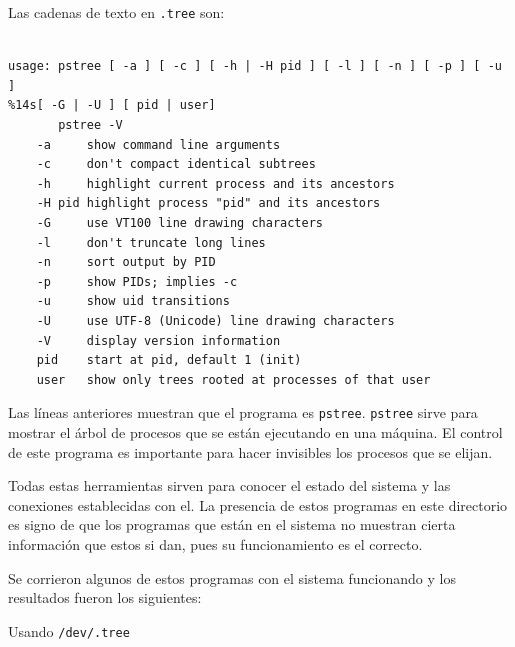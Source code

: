 \vspace{1em}

 Las cadenas de texto en \texttt{.tree} son:
 

\vspace{1em}

\begin{lstlisting}[style=terminal]

usage: pstree [ -a ] [ -c ] [ -h | -H pid ] [ -l ] [ -n ] [ -p ] [ -u ]
%14s[ -G | -U ] [ pid | user]
       pstree -V
    -a     show command line arguments
    -c     don't compact identical subtrees
    -h     highlight current process and its ancestors
    -H pid highlight process "pid" and its ancestors
    -G     use VT100 line drawing characters
    -l     don't truncate long lines
    -n     sort output by PID
    -p     show PIDs; implies -c
    -u     show uid transitions
    -U     use UTF-8 (Unicode) line drawing characters
    -V     display version information
    pid    start at pid, default 1 (init)
    user   show only trees rooted at processes of that user

\end{lstlisting}

\vspace{1em}

Las líneas anteriores muestran que el programa es \texttt{pstree}. \texttt{pstree} 
sirve para mostrar el árbol de procesos que se están ejecutando en una
máquina. El control de este programa es importante para hacer
invisibles los procesos que se elijan.

Todas estas herramientas sirven para conocer el estado del sistema y
las conexiones establecidas con el. La presencia de estos programas en este
directorio es signo de que los programas que están en el sistema no
muestran cierta información que estos si dan, pues su funcionamiento
es el correcto.

Se corrieron algunos de estos programas con el sistema funcionando y
los resultados fueron los siguientes:

Usando \texttt{/dev/.tree}

\vspace{1em}


